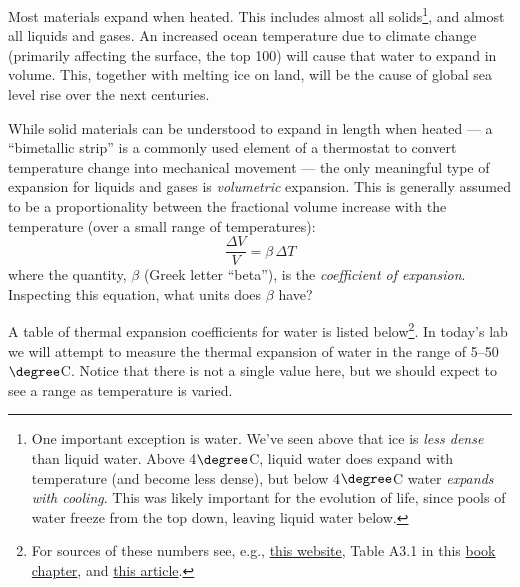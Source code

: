 Most materials expand when heated. This includes almost all solids\footnote{One important exception is water.  We've seen above that ice is {\em less dense} than liquid water.  Above 4$\degree$C, liquid water does expand with temperature (and become less dense), but below 4$\degree$C water {\em expands with cooling}. This was likely important for the evolution of life, since pools of water freeze from the top down, leaving liquid water below.}, and almost all liquids and gases.  An increased ocean temperature due to climate change (primarily affecting the surface, the top \unit{100}{\meter}) will cause that water to expand in volume.  This, together with melting ice on land, will be the cause of global sea level rise over the next centuries.\\[-6pt]

\noindent 

While solid materials can be understood to expand in length when heated --- a ``bimetallic strip'' is a commonly used element of a thermostat to convert temperature change into mechanical movement --- the only meaningful type of expansion for liquids and gases is {\em volumetric} expansion.  This is generally assumed to be a proportionality between the fractional volume increase with the temperature (over a small range of temperatures):
	\begin{equation*}
	\frac{\Delta V}{V} = \beta \, \Delta T
	\end{equation*}
where the quantity, $\beta$ (Greek letter ``beta''), is the {\em coefficient of expansion}.  Inspecting this equation, what units does $\beta$ have?

\answerspace[5cm]

\noindent A table of thermal expansion coefficients for water is listed below\footnote{For sources of these numbers see, e.g., \href{https://web.archive.org/web/20250207061706/https://engineeringtoolbox.com/water-density-specific-weight-d_595.html}{this website}, Table A3.1 in this \href{https://www.aos.wisc.edu/~aos610/Gill_App3.pdf}{book chapter}, and \href{https://www.science.org/doi/10.1126/sciadv.abq0793}{this article}.}.  In today's lab we will attempt to measure the thermal expansion of water in the range of 5--50$\degree$C. Notice that there is not a single value here, but we should expect to see a range as temperature is varied.

\vspace{1cm}


